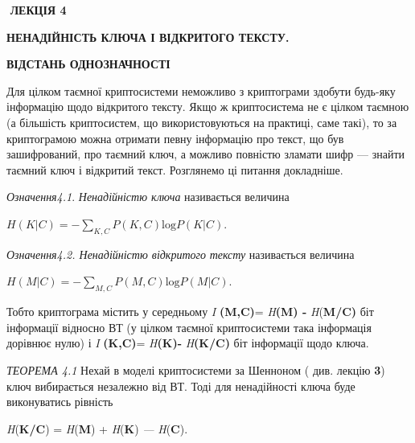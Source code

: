 \bigskip


\bigskip


\bigskip

 $ $\textbf{ ЛЕКЦІЯ  4}


\bigskip

{\centering\bfseries
НЕНАДІЙНІСТЬ  КЛЮЧА  І  ВІДКРИТОГО  ТЕКСТУ.
\par}

{\centering\bfseries
 ВІДСТАНЬ  ОДНОЗНАЧНОСТІ
\par}


\bigskip


\bigskip

Для цілком таємної криптосистеми неможливо з криптограми здобути будь-яку
інформацію щодо відкритого тексту. Якщо ж криптосистема не є цілком таємною (а
більшість криптосистем, що використовуються на практиці, саме такі), то за
криптограмою  можна отримати певну інформацію про текст, що був зашифрований,
про таємний ключ, а можливо повністю зламати шифр --- знайти таємний ключ і
відкритий текст. Розглянемо ці питання докладніше.


\bigskip

\textit{Означення4.1}.  \textit{Ненадійністю ключа }називається  величина 

{\centering
  ${H(K|C)=-\underset{{K,C}}{\sum }{P(K,C)\text{log}P(K|C)}}$.
\par}

\textit{Означення4.2}\textit{. Ненадійністю відкритого }\textit{тексту}
називається  величина 

{\centering
 ${H(M|C)=-\underset{{M,C}}{\sum }{P(M,C)\text{log}P(M|C)}}$. $ $
\par}

Тобто  криптограма  містить у середньому \textit{I}\textit{
}\textbf{(}\textbf{M}\textbf{,}\textbf{C}\textbf{)}=\textit{
}\textit{H}\textbf{(}\textbf{M}\textbf{) -
}\textit{H}(\textbf{M}\textbf{/}\textbf{C}\textbf{)}\textbf{  }біт\textbf{
}інформації відносно ВТ (у цілком таємної криптосистеми така інформація
дорівнює нулю) і  \textit{I}\textit{
}\textbf{(}\textbf{K}\textbf{,}\textbf{C}\textbf{)}=\textit{
}\textit{H}\textbf{(}\textbf{K}\textbf{)-}\textit{
}\textit{H}\textbf{(}\textbf{K}\textbf{/}\textbf{C}\textbf{)}\textbf{ }біт
інформації щодо ключа. 

\textit{ТЕОРЕМА 4.1}\textit{  }Нехай в моделі криптосистеми за Шенноном  ( див.
лекцію \textbf{3})  ключ вибирається незалежно від ВТ. Тоді для ненадійності 
ключа буде виконуватись рівність  

{\centering
\textit{H}(\textbf{K}\textbf{/}\textbf{C}) =  \textit{H}(\textbf{M}) +
\textit{H}(\textbf{K}) \textit{--- }\textit{H}(\textbf{C}).
\par}

